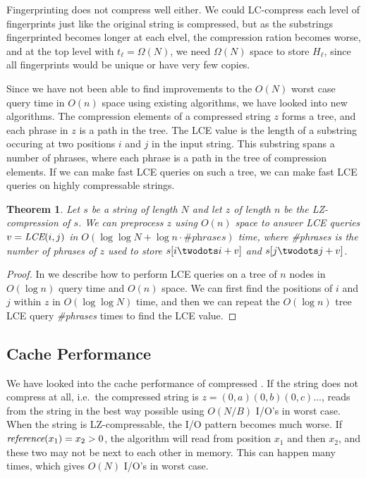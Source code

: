 \documentclass[a4]{article}
\newcommand*{\pref}{\prettyref}
\newtheorem{theorem}{Theorem}
\begin{document}
Fingerprinting does not compress well either. We could LC-compress each level of fingerprints just like the original string is compressed, but as the substrings fingerprinted becomes longer at each elvel, the compression ration becomes worse, and at the top level with $t_\ell = \Omega(N)$, we need $\Omega(N)$ space to store $H_\ell$, since all fingerprints would be unique or have very few copies.

Since we have not been able to find improvements to the $O(N)$ worst case query time in $O(n)$ space using existing algorithms, we have looked into new algorithms. The compression elements of a compressed string $z$ forms a tree, and each phrase in $z$ is a path in the tree. The LCE value is the length of a substring occuring at two positions $i$ and $j$ in the input string. This substring spans a number of phrases, where each phrase is a path in the tree of compression elements. If we can make fast LCE queries on such a tree, we can make fast LCE queries on highly compressable strings.

\begin{theorem}
\label{thm:lz-tree}
Let $s$ be a string of length $N$ and let $z$ of length $n$ be the LZ-compression of $s$. We can preprocess $z$ using $O(n)$ space to answer LCE queries $v=\textit{LCE}(i,j)$ in $O(\log\log N + \log n \cdot \textit{\#phrases})$ time, where \textit{\#phrases} is the number of phrases of $z$ used to store $s[i\twodots i+v]$ and $s[j\twodots j+v]$.
\end{theorem}

\begin{proof}
In \pref{sec:tree-lce} we describe how to perform LCE queries on a tree of $n$ nodes in $O(\log n)$ query time and $O(n)$ space. We can first find the positions of $i$ and $j$ within $z$ in $O(\log\log N)$ time, and then we can repeat the $O(\log n)$ tree LCE query \textit{\#phrases} times to find the LCE value.
\end{proof}

\subsection{Cache Performance}

We have looked into the cache performance of compressed . If the string does not compress at all, i.e.\ the compressed string is $z=(0,a)(0,b)(0,c)...$,  reads from the string in the best way possible using $O(N/B)$ I/O's in worst case. When the string is LZ-compressable, the I/O pattern becomes much worse. If $\textit{reference}(x_1) = x_2 > 0$, the algorithm will read from position $x_1$ and then $x_2$, and these two may not be next to each other in memory. This can happen many times, which gives $O(N)$ I/O's in worst case.
\end{document}
